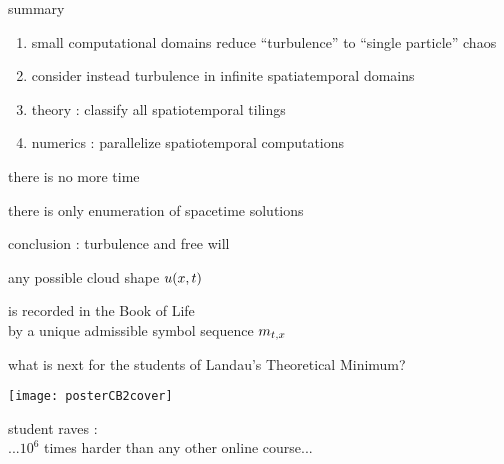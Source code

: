\begin{frame}{summary}
\begin{enumerate}
              \item
small computational domains reduce ``turbulence'' to ``single particle'' chaos
              \item
consider instead turbulence in infinite spatiatemporal domains
              \item
theory : classify all spatiotemporal tilings
              \item
numerics : parallelize spatiotemporal computations
\end{enumerate}

\vfill

there is no more time

\medskip

there is only enumeration of spacetime solutions
\end{frame}

\begin{frame}{conclusion : turbulence and free will}

any possible cloud shape $u(x,t)$

\vfill
is recorded in the Book of Life
\\
 by a unique admissible symbol sequence $m_{t,x}$
\end{frame}


\begin{frame}{
what is next for the students of Landau's Theoretical Minimum?
\\
}
\begin{center}
\texttt{[image: posterCB2cover]}
\end{center}
\vfill
student raves : \\
...$10^6$ times harder than any other online course...
\end{frame}

%

